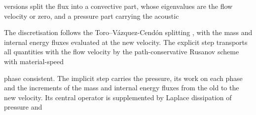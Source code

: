 
versions split the flux into a convective part, whose eigenvalues are the flow velocity or zero, and a pressure part carrying the acoustic

The discretisation follows the Toro--V\'azquez-Cend\'on splitting \cite{ToroVazquez2012}, with the mass and internal energy
fluxes evaluated at the new velocity. The explicit step transports all quantities with the flow velocity by the path-conservative Rusanov scheme \cite{Pares2006,Castro2006} with material-speed

phase consistent. The implicit step carries the pressure, its work on each phase and the increments of the mass and
internal energy fluxes from the old to the new velocity. Its central operator is supplemented by Laplace dissipation of pressure and

